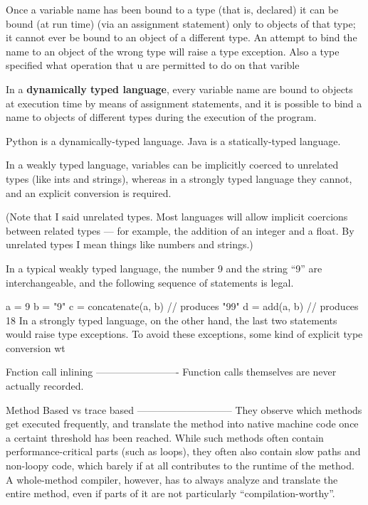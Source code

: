 Once a variable name has been bound to a type (that is, declared) it can be
bound (at run time) (via an assignment statement) only to objects of that type; it cannot
ever be bound to an object of a different type. An attempt to bind the name to
an object of the wrong type will raise a type exception. Also
a type specified what operation that u are permitted to do on that varible

In a \textbf{dynamically typed language}, every variable name  are bound to objects at execution time by
  means of assignment statements, and it is possible to bind a name to objects
  of different types during the execution of the program.

  Python is a dynamically-typed language. 
  Java is a statically-typed language.

\item
In a weakly typed language, variables can be implicitly coerced to unrelated
types (like ints and strings), whereas in a strongly typed language they cannot, and an explicit
conversion is required. 

(Note that I said unrelated types. Most languages will
    allow implicit coercions between related types — for example, the addition
    of an integer and a float. By unrelated types I mean things like numbers
    and strings.)

In a typical weakly typed language, the number 9 and the
string “9” are interchangeable, and the following sequence of statements is
legal.

a  = 9
b = "9"
c = concatenate(a, b)  // produces "99"
d = add(a, b)          // produces 18
In a strongly typed language, on the other hand, the last two statements would
raise type exceptions. To avoid these exceptions, some kind of explicit type
conversion wt

Fnction call inlining
-------------------------
Function calls
themselves are never actually recorded. 

Method Based vs trace based
-----------------------------
They observe which
methods get executed frequently, and translate the method into native machine
code once a certaint threshold has been reached. While such methods often
contain performance-critical parts (such as loops), they often also contain
slow paths and non-loopy code, which barely if at all contributes to the
runtime of the method. A whole-method compiler, however, has to always analyze
and translate the entire method, even if parts of it are not particularly
“compilation-worthy”.


